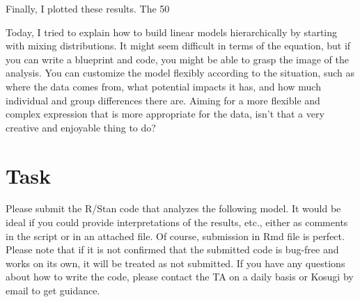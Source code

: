 \documentclass{ltjsbook}
\begin{document}
Finally, I plotted these results. The 50%


Today, I tried to explain how to build linear models hierarchically by starting with mixing distributions. It might seem difficult in terms of the equation, but if you can write a blueprint and code, you might be able to grasp the image of the analysis.
You can customize the model flexibly according to the situation, such as where the data comes from, what potential impacts it has, and how much individual and group differences there are. Aiming for a more flexible and complex expression that is more appropriate for the data, isn't that a very creative and enjoyable thing to do?

\section{Task}
Please submit the R/Stan code that analyzes the following model. It would be ideal if you could provide interpretations of the results, etc., either as comments in the script or in an attached file. Of course, submission in Rmd file is perfect. Please note that if it is not confirmed that the submitted code is bug-free and works on its own, it will be treated as not submitted. If you have any questions about how to write the code, please contact the TA on a daily basis or Kosugi by email to get guidance.
\end{document}
